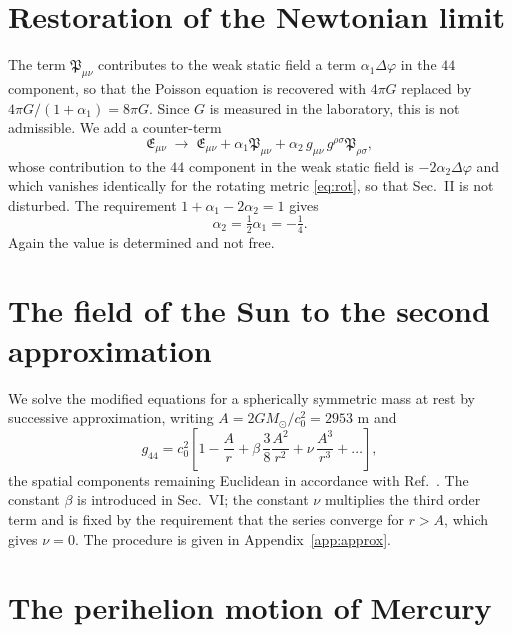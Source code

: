 \documentclass[aps,prd,reprint,amsmath,amssymb,nofootinbib,longbibliography]{revtex4-2}
\begin{document}
\section{Restoration of the Newtonian limit}

The term $\mathfrak{P}_{\mu\nu}$ contributes to the weak static field a term
$\alpha_1 \Delta \varphi$ in the $44$ component, so that the Poisson equation is recovered with
$4\pi G$ replaced by $4\pi G/(1+\alpha_1) = 8\pi G$. Since $G$ is measured in the laboratory, this
is not admissible. We add a counter-term
\begin{equation}
\mathfrak{E}_{\mu\nu} \;\longrightarrow\; \mathfrak{E}_{\mu\nu} + \alpha_1 \mathfrak{P}_{\mu\nu}
 + \alpha_2\, g_{\mu\nu}\, g^{\rho\sigma}\mathfrak{P}_{\rho\sigma} ,
\label{eq:alpha2}
\end{equation}
whose contribution to the $44$ component in the weak static field is $-2\alpha_2 \Delta\varphi$ and
which vanishes identically for the rotating metric \eqref{eq:rot}, so that Sec.~II is not disturbed.
The requirement $1 + \alpha_1 - 2\alpha_2 = 1$ gives
\begin{equation}
\alpha_2 = \tfrac{1}{2}\alpha_1 = -\tfrac{1}{4} .
\end{equation}
Again the value is determined and not free.

\section{The field of the Sun to the second approximation}

We solve the modified equations for a spherically symmetric mass at rest by successive
approximation, writing $A = 2GM_\odot/c_0^{2} = 2953$ m and
\begin{equation}
g_{44} = c_0^{2}\left[ 1 - \frac{A}{r} + \beta\,\frac{3}{8}\frac{A^{2}}{r^{2}} + \nu\,
   \frac{A^{3}}{r^{3}} + \dots \right] ,
\label{eq:g44}
\end{equation}
the spatial components remaining Euclidean in accordance with Ref.~\cite{paperD}. The constant
$\beta$ is introduced in Sec.~VI; the constant $\nu$ multiplies the third order term and is fixed by
the requirement that the series converge for $r > A$, which gives $\nu = 0$. The procedure is
given in Appendix~\ref{app:approx}.

\section{The perihelion motion of Mercury}
\end{document}
